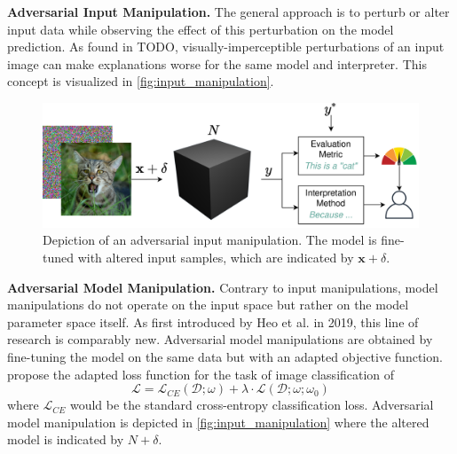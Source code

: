 \par\smallskip
\noindent\textbf{Adversarial Input Manipulation.} The general approach is to perturb or alter input data while observing the effect of this perturbation on the model prediction. As found in TODO, visually-imperceptible perturbations of an input image can make explanations worse for the same model and interpreter. 
This concept is visualized in \autoref{fig:input_manipulation}. 

\begin{figure}[ht]
    \centering
    \includegraphics[width=\linewidth]{figures/input_manipulations.png}
    \caption{Depiction of an adversarial input manipulation. The model is fine-tuned with altered input samples, which are indicated by $\mathbf{x}+\delta$.}
    \label{fig:input_manipulation}
    \vspace{-0.3cm}
\end{figure}

\par\smallskip
\noindent\textbf{Adversarial Model Manipulation.} 
Contrary to input manipulations, model manipulations do not operate on the input space but rather on the model parameter space itself. 
As first introduced by Heo et al. \cite{fooling_nn_interpreters} in 2019, this line of research is comparably new. 
Adversarial model manipulations are obtained by fine-tuning the model on the same data but with an adapted objective function. \cite{fooling_nn_interpreters} propose the adapted loss function for the task of image classification of $$ \mathcal{L} = \mathcal{L}_{CE}(\mathcal{D};\omega) + \lambda \cdot \mathcal{L}(\mathcal{D};\omega; \omega_0) $$ where $\mathcal{L}_{CE}$ would be the standard cross-entropy classification loss. 
Adversarial model manipulation is depicted in \autoref{fig:input_manipulation} where the altered model is indicated by $N+\delta$.


